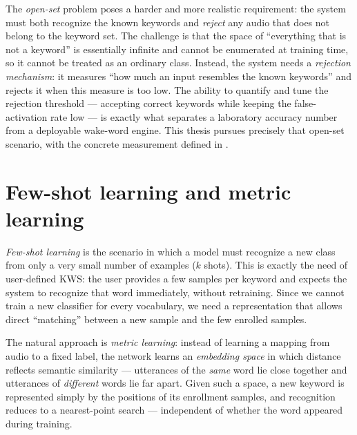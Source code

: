 \documentclass[12pt,a4paper]{report}
\begin{document}
The \emph{open-set} problem poses a harder and more realistic requirement: the
system must both recognize the known keywords and \emph{reject} any audio that
does not belong to the keyword set. The challenge is that the space of
``everything that is not a keyword'' is essentially infinite and cannot be
enumerated at training time, so it cannot be treated as an ordinary class.
Instead, the system needs a \emph{rejection mechanism}: it measures ``how much an
input resembles the known keywords'' and rejects it when this measure is too low.
The ability to quantify and tune the rejection threshold --- accepting correct
keywords while keeping the false-activation rate low --- is exactly what separates
a laboratory accuracy number from a deployable wake-word engine. This thesis
pursues precisely that open-set scenario, with the concrete measurement defined in
.

\section{Few-shot learning and metric learning}\label{sec:fewshot-bg}

\emph{Few-shot learning} is the scenario in which a model must recognize a new
class from only a very small number of examples ($k$ shots). This is exactly the
need of user-defined KWS: the user provides a few samples per keyword and expects
the system to recognize that word immediately, without retraining. Since we cannot
train a new classifier for every vocabulary, we need a representation that allows
direct ``matching'' between a new sample and the few enrolled samples.

The natural approach is \emph{metric learning}: instead of learning a mapping from
audio to a fixed label, the network learns an \emph{embedding space} in which
distance reflects semantic similarity --- utterances of the \emph{same} word lie
close together and utterances of \emph{different} words lie far apart. Given such a
space, a new keyword is represented simply by the positions of its enrollment
samples, and recognition reduces to a nearest-point search --- independent of
whether the word appeared during training.
\end{document}

